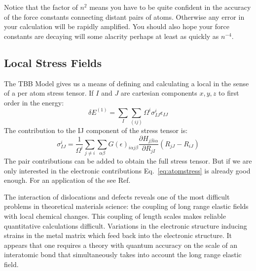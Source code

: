Notice that the factor of $n^{2}$ means you have to be quite confident in the accuracy of
the force constants connecting distant pairs of atoms. Otherwise any error
in your calculation will be rapidly amplified. You should also hope your force
constants are decaying will some alacrity perhaps at least as quickly as $n^{-4}$.

\subsection{Local Stress Fields}
The TBB Model \cite{nielsen83, sutton88} gives us a means of defining and calculating 
a local in the sense of a per atom stress tensor. If $I$ and $J$ 
are cartesian components $x,y,z$ to first order in the energy:
%
\begin{equation}
\delta E^(1) = \sum_{I} \sum_{(ij)}\Omega^{i}\sigma^{i}_{IJ}\epsilon_{IJ}
\end{equation}
%
The contribution to the IJ component of the stress tensor is:
%
\begin{equation}
\label{eq:atomstress}
\sigma^{i}_{IJ} = \frac{1}{\Omega^{i}}\sum_{j\neq i}\sum_{\alpha\beta}G(\epsilon)_{i\alpha j\beta}\frac{\partial H_{j\beta i\alpha}}{\partial R_{jI}}(R_{jJ}-R_{iJ})
\end{equation}
%
The pair contributions can be added to obtain the full stress tensor. 
But if we are only interested in the electronic contributions
Eq.~\ref{eq:atomstress} is already good enough. For an application of the 
see Ref.~\cite{ohta90}



The interaction of dislocations and defects reveals one of the most difficult problems
in theoretical materials science: the coupling of long range elastic fields
with local chemical changes. This coupling of length scales makes
reliable quantitative calculations difficult. Variations in the electronic structure
inducing strains in the metal matrix which feed back into the electronic structure. 
It appears that one requires a theory with quantum accuracy on the scale of an 
interatomic bond that simultaneously takes into account the long range elastic 
field.


